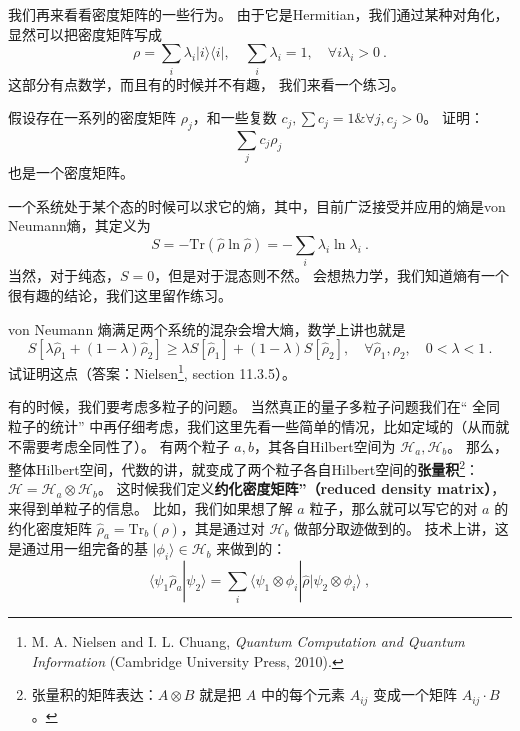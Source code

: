 我们再来看看密度矩阵的一些行为。 由于它是Hermitian，我们通过某种对角化，显然可以把密度矩阵写成
\begin{equation}
\rho = \sum_i\lambda_i|i\rangle\langle i|,\quad \sum_i\lambda_i = 1,\quad \forall i\lambda_i > 0 ~.
\end{equation}
这部分有点数学，而且有的时候并不有趣， 我们来看一个练习。

\begin{exercise}{}
假设存在一系列的密度矩阵 $\rho_j$，和一些复数 $c_j, \sum c_j = 1 \& \forall j, c_j>0$。 证明：
\begin{equation}
\sum_j c_j \rho_j~
\end{equation}
也是一个密度矩阵。
\end{exercise}

一个系统处于某个态的时候可以求它的熵，其中，目前广泛接受并应用的熵是von Neumann熵，其定义为
\begin{equation}
S=-\text{Tr}(\hat\rho\ln\hat\rho)=-\sum_i\lambda_i\ln\lambda_i~.
\end{equation}
当然，对于纯态，$S=0$，但是对于混态则不然。 会想热力学，我们知道熵有一个很有趣的结论，我们这里留作练习。

\begin{exercise}{}
von Neumann 熵满足两个系统的混杂会增大熵，数学上讲也就是
\begin{equation}
S[\lambda\hat\rho_1+(1-\lambda)\hat\rho_2]\ge\lambda S[\hat\rho_1]+(1-\lambda) S[\hat\rho_2],\quad \forall \hat\rho_1,\rho_2,\quad 0<\lambda<1~.
\end{equation}
试证明这点（答案：Nielsen\footnote{M. A. Nielsen and I. L. Chuang, \textsl{Quantum Computation and Quantum Information} (Cambridge University Press, 2010).}, section 11.3.5）。
\end{exercise}

有的时候，我们要考虑多粒子的问题。 当然真正的量子多粒子问题我们在“ 全同粒子的统计” 中再仔细考虑，我们这里先看一些简单的情况，比如定域的（从而就不需要考虑全同性了）。 有两个粒子 $a, b$，其各自Hilbert空间为 $\mathcal{H}_a, \mathcal{H}_b$。 那么，整体Hilbert空间，代数的讲，就变成了两个粒子各自Hilbert空间的\textbf{张量积}\footnote{张量积的矩阵表达：$A\otimes B$ 就是把 $A$ 中的每个元素 $A_{ij}$ 变成一个矩阵 $A_{ij}\cdot B$。}：$\mathcal{H} = \mathcal{H}_a\otimes \mathcal{H}_b$。 这时候我们定义\textbf{约化密度矩阵”（reduced density matrix）}，来得到单粒子的信息。 比如，我们如果想了解 $a$ 粒子，那么就可以写它的对 $a$ 的约化密度矩阵 $\hat\rho_a=\text{Tr}_b(\hat\rho)$，其是通过对 $\mathcal{H}_b$ 做部分取迹做到的。 技术上讲，这是通过用一组完备的基 $|\phi_i\rangle \in\mathcal{H}_b$ 来做到的：
\begin{equation}
\langle\psi_1\hat\rho_a|\psi_2\rangle=\sum_i\langle\psi_1\otimes\phi_i|\hat\rho|\psi_2\otimes\phi_i\rangle~,
\end{equation}


